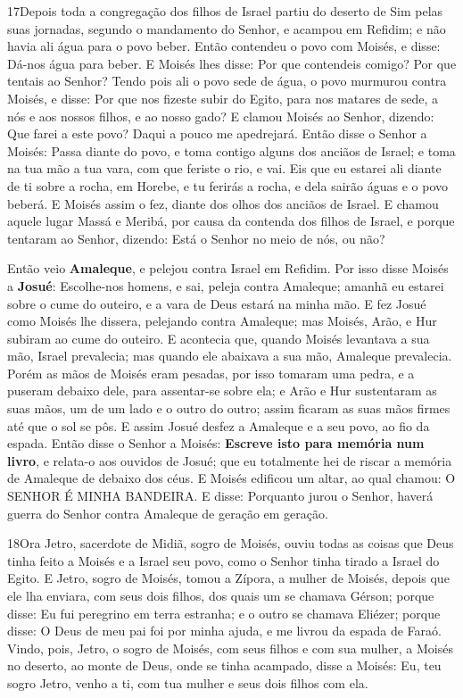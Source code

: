 \medskip

\lettrine{17} Depois toda a congregação dos filhos de Israel
partiu do deserto de Sim pelas suas jornadas, segundo o mandamento
do Senhor, e acampou em Refidim; e não havia ali água para o povo
beber. Então contendeu o povo com Moisés, e disse: Dá-nos água
para beber. E Moisés lhes disse: Por que contendeis comigo? Por que
tentais ao Senhor? Tendo pois ali o povo sede de água, o povo
murmurou contra Moisés, e disse: Por que nos fizeste subir do Egito,
para nos matares de sede, a nós e aos nossos filhos, e ao nosso
gado? E clamou Moisés ao Senhor, dizendo: Que farei a este povo?
Daqui a pouco me apedrejará. Então disse o Senhor a Moisés:
Passa diante do povo, e toma contigo alguns dos anciãos de Israel; e
toma na tua mão a tua vara, com que feriste o rio, e vai. Eis
que eu estarei ali diante de ti sobre a rocha, em Horebe, e tu
ferirás a rocha, e dela sairão águas e o povo beberá. E Moisés assim
o fez, diante dos olhos dos anciãos de Israel. E chamou aquele
lugar Massá e Meribá, por causa da contenda dos filhos de Israel, e
porque tentaram ao Senhor, dizendo: Está o Senhor no meio de nós, ou
não?

Então veio \textbf{Amaleque}, e pelejou contra Israel em Refidim.
Por isso disse Moisés a \textbf{Josué}: Escolhe-nos homens, e
sai, peleja contra Amaleque; amanhã eu estarei sobre o cume do
outeiro, e a vara de Deus estará na minha mão. E fez Josué
como Moisés lhe dissera, pelejando contra Amaleque; mas Moisés,
Arão, e Hur subiram ao cume do outeiro. E acontecia que,
quando Moisés levantava a sua mão, Israel prevalecia; mas quando ele
abaixava a sua mão, Amaleque prevalecia. Porém as mãos de
Moisés eram pesadas, por isso tomaram uma pedra, e a puseram debaixo
dele, para assentar-se sobre ela; e Arão e Hur sustentaram as suas
mãos, um de um lado e o outro do outro; assim ficaram as suas mãos
firmes até que o sol se pôs. E assim Josué desfez a Amaleque
e a seu povo, ao fio da espada. Então disse o Senhor a
Moisés: \textbf{Escreve isto para memória num livro}, e relata-o aos
ouvidos de Josué; que eu totalmente hei de riscar a memória de
Amaleque de debaixo dos céus. E Moisés edificou um altar, ao
qual chamou: O SENHOR É MINHA BANDEIRA. E disse: Porquanto
jurou o Senhor, haverá guerra do Senhor contra Amaleque de geração
em geração.

\medskip

\lettrine{18} Ora Jetro, sacerdote de Midiã, sogro de Moisés,
ouviu todas as coisas que Deus tinha feito a Moisés e a Israel seu
povo, como o Senhor tinha tirado a Israel do Egito. E Jetro,
sogro de Moisés, tomou a Zípora, a mulher de Moisés, depois que ele
lha enviara, com seus dois filhos, dos quais um se chamava
Gérson; porque disse: Eu fui peregrino em terra estranha; e o
outro se chamava Eliézer; porque disse: O Deus de meu pai foi por
minha ajuda, e me livrou da espada de Faraó. Vindo, pois, Jetro,
o sogro de Moisés, com seus filhos e com sua mulher, a Moisés no
deserto, ao monte de Deus, onde se tinha acampado, disse a
Moisés: Eu, teu sogro Jetro, venho a ti, com tua mulher e seus dois
filhos com ela.

